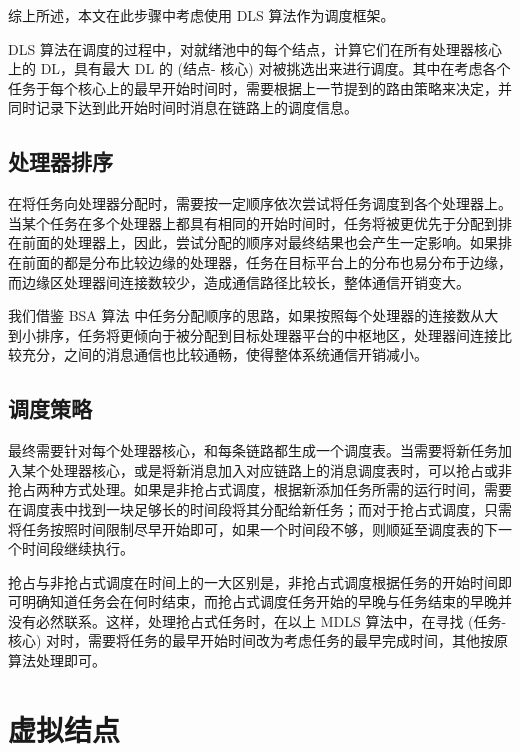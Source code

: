 综上所述，本文在此步骤中考虑使用 DLS 算法作为调度框架。

DLS 算法在调度的过程中，对就绪池中的每个结点，计算它们在所有处理器核心上的 DL，具有最大 DL 的 (结点- 核心) 对被挑选出来进行调度。其中在考虑各个任务于每个核心上的最早开始时间时，需要根据上一节提到的路由策略来决定，并同时记录下达到此开始时间时消息在链路上的调度信息。


\subsection{处理器排序}
\label{DLS-processor-sort}


在将任务向处理器分配时，需要按一定顺序依次尝试将任务调度到各个处理器上。当某个任务在多个处理器上都具有相同的开始时间时，任务将被更优先于分配到排在前面的处理器上，因此，尝试分配的顺序对最终结果也会产生一定影响。如果排在前面的都是分布比较边缘的处理器，任务在目标平台上的分布也易分布于边缘，而边缘区处理器间连接数较少，造成通信路径比较长，整体通信开销变大。

我们借鉴 BSA 算法 中任务分配顺序的思路，如果按照每个处理器的连接数从大到小排序，任务将更倾向于被分配到目标处理器平台的中枢地区，处理器间连接比较充分，之间的消息通信也比较通畅，使得整体系统通信开销减小。

\subsection{调度策略}


最终需要针对每个处理器核心，和每条链路都生成一个调度表。当需要将新任务加入某个处理器核心，或是将新消息加入对应链路上的消息调度表时，可以抢占或非抢占两种方式处理。如果是非抢占式调度，根据新添加任务所需的运行时间，需要在调度表中找到一块足够长的时间段将其分配给新任务；而对于抢占式调度，只需将任务按照时间限制尽早开始即可，如果一个时间段不够，则顺延至调度表的下一个时间段继续执行。

抢占与非抢占式调度在时间上的一大区别是，非抢占式调度根据任务的开始时间即可明确知道任务会在何时结束，而抢占式调度任务开始的早晚与任务结束的早晚并没有必然联系。这样，处理抢占式任务时，在以上 MDLS 算法中，在寻找 (任务-核心) 对时，需要将任务的最早开始时间改为考虑任务的最早完成时间，其他按原算法处理即可。

\section{虚拟结点}
\label{DLS-virtual-node}

